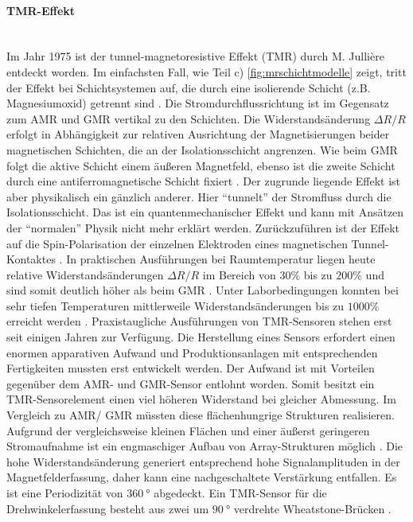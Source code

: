 \paragraph{TMR-Effekt}\label{par:TMR}$~$\\


Im Jahr 1975 ist der tunnel-magnetoresistive Effekt (TMR) durch M. Jullière entdeckt worden. Im einfachsten Fall, wie Teil c) \autoref{fig:mrschichtmodelle} zeigt, tritt der Effekt bei Schichtsystemen auf, die durch eine isolierende Schicht (z.B. Magnesiumoxid) getrennt sind \cite{Lemme2016}. Die Stromdurchflussrichtung ist im Gegensatz zum AMR und GMR vertikal zu den Schichten. Die Widerstandsänderung $\Delta R/R$ erfolgt in Abhängigkeit zur relativen Ausrichtung der Magnetisierungen beider magnetischen Schichten, die an der Isolationsschicht angrenzen.
\newline
Wie beim GMR folgt die aktive Schicht einem äußeren Magnetfeld, ebenso ist die zweite Schicht durch eine antiferromagnetische Schicht fixiert  \cite{Tille2020}. Der zugrunde liegende Effekt ist aber physikalisch ein gänzlich anderer. Hier ``tunnelt'' der Stromfluss durch die Isolationsschicht. Das ist ein quantenmechanischer Effekt und kann mit Ansätzen der ``normalen'' Physik nicht mehr erklärt werden. Zurückzuführen ist der Effekt auf die Spin-Polarisation der einzelnen Elektroden eines magnetischen Tunnel-Kontaktes \cite{Tille2020}.
\newline
In praktischen Ausführungen bei Raumtemperatur liegen heute relative Widerstandsänderungen $\Delta R/R$ im Bereich von $30\%$ bis zu $200\%$ und sind somit deutlich höher als beim GMR \cite{Tille2020}. Unter Laborbedingungen konnten bei sehr tiefen Temperaturen mittlerweile Widerstandsänderungen bis zu $1000\%$ erreicht werden \cite{Lemme2016}.
\newline
Praxistaugliche Ausführungen von TMR-Sensoren stehen erst seit einigen Jahren zur Verfügung. Die Herstellung eines Sensors erfordert einen enormen apparativen Aufwand und Produktionsanlagen mit entsprechenden Fertigkeiten mussten erst entwickelt werden. Der Aufwand ist mit Vorteilen gegenüber dem AMR- und GMR-Sensor entlohnt worden.
Somit besitzt ein TMR-Sensorelement einen viel höheren Widerstand bei gleicher Abmessung. Im Vergleich zu AMR/ GMR müssten diese flächenhungrige Strukturen realisieren. Aufgrund der vergleichsweise kleinen Flächen und einer äußerst geringeren Stromaufnahme ist ein engmaschiger Aufbau von Array-Strukturen möglich \cite{Lemme2016}. Die hohe Widerstandsänderung generiert entsprechend hohe Signalamplituden in der Magnetfelderfassung, daher kann eine nachgeschaltete Verstärkung entfallen. Es ist eine Periodizität von $\SI{360}{\degree}$ abgedeckt. Ein TMR-Sensor für die Drehwinkelerfassung besteht aus zwei um $\SI{90}{\degree}$ verdrehte Wheatstone-Brücken \cite{TDK2016}.


